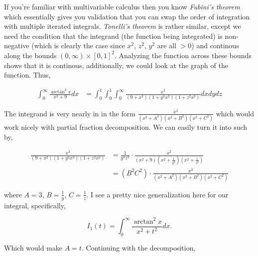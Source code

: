\documentclass{article}
\begin{document}
If you're familiar with multivariable calculus then you know \textit{Fubini's theorem} which essentially gives you validation that you can swap the order of integration with multiple iterated integrals. \textit{Tonelli’s theorem} is rather similar, except we need the condition that the integrand (the function being integrated) is non-negative (which is clearly the case since $x^2$, $z^2$, $y^2$ are all $>0$) and continous along the bounds $(0, \infty) \times [0, 1]^2$. Analyzing the function across these bounds shows that it is continous, additionally, we could look at the graph of the function. Thus,

\begin{align*}
    \int_{0}^{\infty}{\frac{\arctan^2{x}}{x^2 + 9}dx} &= \int_{0}^{1}{\int_{0}^{1}{\int_{0}^{\infty}{\frac{x^2}{(9+x^2)(1+y^2x^2)(1+z^2x^2)}dxdydz}}}
\end{align*}

The integrand is very nearly in in the form $\frac{x^2}{(x^2 + A^2)(x^2 + B^2)(x^2 + C^2)}$ which would work nicely with partial fraction decomposition. We can easily turn it into such by,

\begin{align*}
    \frac{x^2}{(9+x^2)(1+y^2x^2)(1+z^2x^2)} &= \frac{1}{y^2 z^2}\cdot\frac{x^2}{(x^2 + 9)(x^2 + \frac{1}{y^2})(x^2 + \frac{1}{z^2})} \\ 
    &= (B^2 C^2)\cdot\frac{x^2}{(x^2 + A^2)(x^2 + B^2)(x^2 + C^2)}
\end{align*}

where $A = 3$, $B = \frac{1}{y}$, $C = \frac{1}{z}$. I see a pretty nice generalization here for our integral, specifically,

$$
I_{1}(t) = \int_{0}^{\infty}{\frac{\arctan^2{x}}{x^2 + t^2}dx}.
$$

Which would make $A = t$. Continuing with the decomposition,

\end{document}
